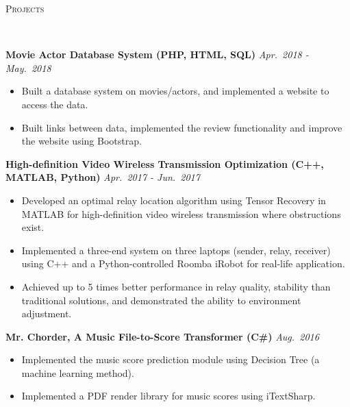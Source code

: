 \documentclass[10pt]{article}
\newenvironment{changemargin}[2]{%
  \begin{list}{}{%
    \setlength{\topsep}{0pt}%
    \setlength{\leftmargin}{#1}%
    \setlength{\rightmargin}{#2}%
    \setlength{\listparindent}{\parindent}%
    \setlength{\itemindent}{\parindent}%
    \setlength{\parsep}{\parskip}%
  }%
  \item[]}{\end{list}
}
\newcommand{\lineover}{
	\begin{changemargin}{-0.05in}{-0.05in}
		\vspace*{-8pt}
		\hrulefill \\
		\vspace*{-2pt}
	\end{changemargin}
}
\newcommand{\header}[1]{
	\begin{changemargin}{-0.7in}{-0.65in}
		\scshape{\large{#1}}\\
  	\lineover
	\end{changemargin}
}
\newenvironment{body} {
	\vspace*{-16pt}
	\begin{changemargin}{-0.65in}{-0.62in}
  }	
	{\end{changemargin}
}
\begin{document}
\smallskip
\vspace{-8pt}

\header{Projects}

\begin{body}
	\vspace{14pt}

        \textbf{Movie Actor Database System (PHP, HTML, SQL)} \hfill \emph{Apr.~2018 - May.~2018}
	\vspace*{-5pt}
	\begin{itemize} \itemsep -0pt		
		
		\item Built a database system on movies/actors, and implemented a website to access the data.
		\item Built links between data, implemented the review functionality and improve the website using Bootstrap.
	\end{itemize}
	
	\vspace{-2pt}
	
	\textbf{High-definition Video Wireless Transmission Optimization (C++, MATLAB, Python)} \hfill \emph{Apr.~2017 - Jun.~2017}
	\vspace*{-5pt}
	\begin{itemize} \itemsep -0pt		
		
		\item Developed an optimal relay location algorithm using Tensor Recovery in MATLAB for high-definition video wireless transmission where obstructions exist.
		\item Implemented a three-end system on three laptops (sender, relay, receiver) using C++ and a Python-controlled Roomba iRobot for real-life application.
		\item Achieved up to 5 times better performance in relay quality, stability than traditional solutions, and demonstrated the ability to environment adjustment.
	\end{itemize}
	
	\vspace{-2pt}
	
	\textbf{Mr. Chorder, A Music File-to-Score Transformer (C\#)} \hfill \emph{Aug.~2016}
	\vspace*{-5pt}
	\begin{itemize} \itemsep -0pt		
		
		\item Implemented the music score prediction module using Decision Tree (a machine learning method).
		\item Implemented a PDF render library for music scores using iTextSharp.
	\end{itemize}
	

\end{body}
\end{document}
